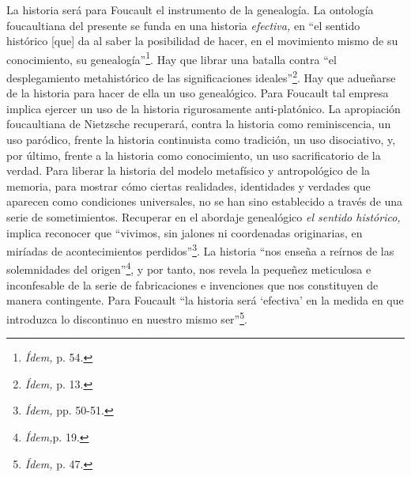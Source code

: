 La historia será para Foucault el instrumento de la genealogía. La ontología foucaultiana del presente se funda en una historia \emph{efectiva,} en \enquote{el sentido histórico {[}que{]} da al saber la posibilidad de hacer, en el movimiento mismo de su conocimiento, su genealogía}\footnote{\emph{Ídem,} p. 54.}. Hay que librar una batalla contra \enquote{el desplegamiento metahistórico de las significaciones ideales}\footnote{\emph{Ídem,} p. 13.}. Hay que adueñarse de la historia para hacer de ella un uso genealógico. Para Foucault tal empresa implica ejercer un uso de la historia rigurosamente anti-platónico. La apropiación foucaultiana de Nietzsche recuperará, contra la historia como reminiscencia, un uso paródico, frente la historia continuista como tradición, un uso disociativo, y, por último, frente a la historia como conocimiento, un uso sacrificatorio de la verdad. Para liberar la historia del modelo metafísico y antropológico de la memoria, para mostrar cómo ciertas realidades, identidades y verdades que aparecen como condiciones universales, no se han sino establecido a través de una serie de sometimientos. Recuperar en el abordaje genealógico \emph{el sentido histórico,} implica reconocer que \enquote{vivimos, sin jalones ni coordenadas originarias, en miríadas de acontecimientos perdidos}\footnote{\emph{Ídem,} pp. 50-51.}. La historia \enquote{nos enseña a reírnos de las solemnidades del origen}\footnote{\emph{Ídem,}p. 19.}, y por tanto, nos revela la pequeñez meticulosa e inconfesable de la serie de fabricaciones e invenciones que nos constituyen de manera contingente. Para Foucault \enquote{la historia será \enquote{efectiva} en la medida en que introduzca lo discontinuo en nuestro mismo ser}\footnote{\emph{Ídem,} p. 47.}.

